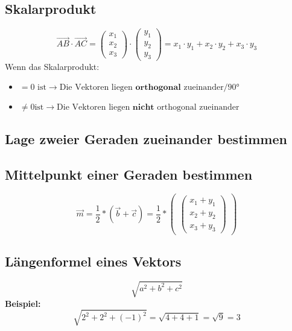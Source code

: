\documentclass[a4paper,12pt]{article}
\begin{document}
	\subsection*{Skalarprodukt}
		$$
		\vec{AB} \cdot \vec{AC} = 
		\begin{pmatrix} 
			x_{1} \\
			x_{2} \\
			x_{3} 
		\end{pmatrix}
		\cdot 
		\begin{pmatrix} 
			y_{1} \\
			y_{2} \\
			y_{3}
		\end{pmatrix} = x_{1} \cdot y_{1}+x_{2} \cdot y_{2}+x_{3} \cdot y_{3}
		$$
		Wenn das Skalarprodukt:
			\begin{itemize}
				\item $=0 \text{ ist} \rightarrow \text{Die Vektoren liegen } \textbf{orthogonal } \text{zueinander/90°}$
				\item $\neq 0 \text{ist} \rightarrow \text{Die Vektoren liegen } \textbf{nicht } \text{orthogonal zueinander}$
			\end{itemize}
	\subsection*{Lage zweier Geraden zueinander bestimmen}
	\subsection*{Mittelpunkt einer Geraden bestimmen}
		$$
\vec{m} = \frac{1}{2}*(\vec{b}+\vec{c})=\frac{1}{2}*
\begin{pmatrix}
\begin{pmatrix} 
x_{1}+y_{1} \\
x_{2}+y_{2} \\
x_{3}+y_{3}
\end{pmatrix}
\end{pmatrix}
$$
	\subsection*{Längenformel eines Vektors}
		$$
\sqrt{a^{2}+b^{2}+c^{2}}
$$
		\textbf{Beispiel:}
		$$
\sqrt{2^{2}+2^{2}+(-1)^{2}}=
\sqrt{4+4+1}=
\sqrt{9}=3
$$
\end{document}
